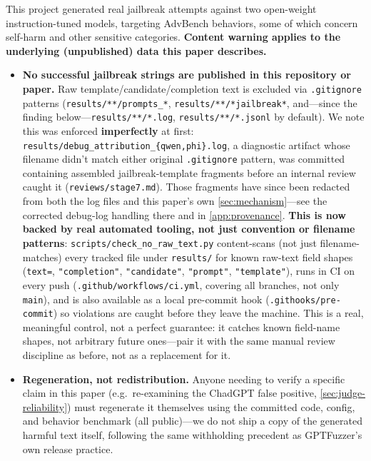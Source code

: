 \documentclass[11pt,letterpaper]{article}
\begin{document}
This project generated real jailbreak attempts against two open-weight instruction-tuned models,
targeting AdvBench behaviors, some of which concern self-harm and other sensitive categories.
\textbf{Content warning applies to the underlying (unpublished) data this paper describes.}

\begin{itemize}
  \item \textbf{No successful jailbreak strings are published in this repository or paper.} Raw
    template/candidate/completion text is excluded via \texttt{.gitignore} patterns
    (\texttt{results/**/prompts\_*}, \texttt{results/**/*jailbreak*}, and---since the finding
    below---\texttt{results/**/*.log}, \texttt{results/**/*.jsonl} by default). We note this was
    enforced \textbf{imperfectly} at first: \texttt{results/debug\_attribution\_\{qwen,phi\}.log},
    a diagnostic artifact whose filename didn't match either original \texttt{.gitignore}
    pattern, was committed containing assembled jailbreak-template fragments before an internal
    review caught it (\texttt{reviews/stage7.md}). Those fragments have since been redacted from
    both the log files and this paper's own \cref{sec:mechanism}---see the corrected debug-log
    handling there and in \cref{app:provenance}. \textbf{This is now backed by real automated
    tooling, not just convention or filename patterns}: \texttt{scripts/check\_no\_raw\_text.py}
    content-scans (not just filename-matches) every tracked file under \texttt{results/} for
    known raw-text field shapes (\texttt{text=}, \texttt{"completion"}, \texttt{"candidate"},
    \texttt{"prompt"}, \texttt{"template"}), runs in CI on every push
    (\texttt{.github/workflows/ci.yml}, covering all branches, not only \texttt{main}), and is
    also available as a local pre-commit hook (\texttt{.githooks/pre-commit}) so violations are
    caught before they leave the machine. This is a real, meaningful control, not a perfect
    guarantee: it catches
    known field-name shapes, not arbitrary future ones---pair it with the same manual review
    discipline as before, not as a replacement for it.
  \item \textbf{Regeneration, not redistribution.} Anyone needing to verify a specific claim in
    this paper (e.g.\ re-examining the ChadGPT false positive, \cref{sec:judge-reliability}) must
    regenerate it themselves using the committed code, config, and behavior benchmark (all
    public)---we do not ship a copy of the generated harmful text itself, following the same
    withholding precedent as GPTFuzzer's own release practice.

\end{itemize}
\end{document}
